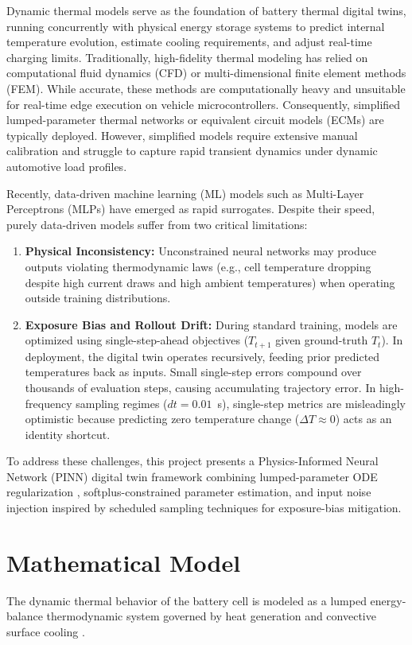 \documentclass[12pt,a4paper]{article}
\begin{document}
Dynamic thermal models serve as the foundation of battery thermal digital twins, running concurrently with physical energy storage systems to predict internal temperature evolution, estimate cooling requirements, and adjust real-time charging limits. Traditionally, high-fidelity thermal modeling has relied on computational fluid dynamics (CFD) or multi-dimensional finite element methods (FEM). While accurate, these methods are computationally heavy and unsuitable for real-time edge execution on vehicle microcontrollers. Consequently, simplified lumped-parameter thermal networks or equivalent circuit models (ECMs) are typically deployed. However, simplified models require extensive manual calibration and struggle to capture rapid transient dynamics under dynamic automotive load profiles.

Recently, data-driven machine learning (ML) models such as Multi-Layer Perceptrons (MLPs) have emerged as rapid surrogates. Despite their speed, purely data-driven models suffer from two critical limitations:
\begin{enumerate}
    \item \textbf{Physical Inconsistency:} Unconstrained neural networks may produce outputs violating thermodynamic laws (e.g., cell temperature dropping despite high current draws and high ambient temperatures) when operating outside training distributions.
    \item \textbf{Exposure Bias and Rollout Drift:} During standard training, models are optimized using single-step-ahead objectives ($T_{t+1}$ given ground-truth $T_t$). In deployment, the digital twin operates recursively, feeding prior predicted temperatures back as inputs. Small single-step errors compound over thousands of evaluation steps, causing accumulating trajectory error. In high-frequency sampling regimes ($dt = 0.01$~s), single-step metrics are misleadingly optimistic because predicting zero temperature change ($\Delta T \approx 0$) acts as an identity shortcut.
\end{enumerate}

To address these challenges, this project presents a Physics-Informed Neural Network (PINN) digital twin framework combining lumped-parameter ODE regularization \cite{bernardi1985general, raissi2019physicsinformed, chen2022physics}, softplus-constrained parameter estimation, and input noise injection inspired by scheduled sampling techniques \cite{bengio2015scheduled, ranzato2015sequence} for exposure-bias mitigation.

\section{Mathematical Model}
The dynamic thermal behavior of the battery cell is modeled as a lumped energy-balance thermodynamic system governed by heat generation and convective surface cooling \cite{bernardi1985general, saha2014lumped}.
\end{document}
